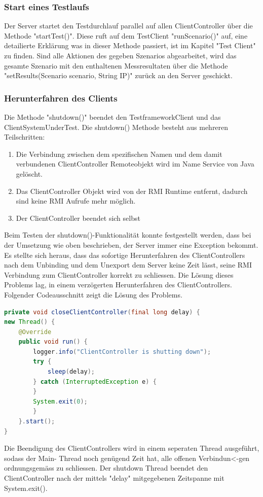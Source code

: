 \subsubsection{Start eines Testlaufs}
Der Server startet den Testdurchlauf parallel auf allen ClientController über die Methode "startTest()". Diese ruft auf dem TestClient "runScenario()" auf, eine detailierte Erklärung was in dieser Methode passiert, ist im Kapitel "Test Client" zu finden. Sind alle Aktionen des gegeben Szenarios abgearbeitet, wird das gesamte Szenario mit den enthaltenen Messresultaten über die Methode "setResults(Scenario scenario, String IP)" zurück an den Server geschickt.

\subsubsection{Herunterfahren des Clients}
Die Methode "shutdown()" be\-endet den Test\-framework\-Client und das Client\-System\-Under\-Test. Die shutdown() Methode besteht aus mehreren Teilschritten:
\begin{enumerate}
\item Die Verbindung zwischen dem spezifischen Namen und dem damit verbundenen ClientController Remoteobjekt wird im Name Service von Java gelöscht.
\item Das ClientController Objekt wird von der RMI Run\-time entfernt, da\-durch sind keine RMI Aufrufe mehr möglich.
\item Der ClientController beendet sich selbst
\end{enumerate}


Beim Testen der shutdown()-Funktionalität konnte festgestellt werden, dass bei der Umsetzung wie oben beschrieben, der Server immer eine Exception bekommt. Es stellte sich heraus, dass das sofortige Herunterfahren des ClientControllers nach dem Unbinding und dem Unexport dem Server keine Zeit lässt, seine RMI Verbindung zum ClientController korrekt zu schliessen. Die Lösung dieses Problems lag, in einem verzögerten Herunterfahren des ClientControllers. Folgender Codeausschnitt zeigt die Lösung des Problems.
\begin{lstlisting}[language=java, breaklines=true]
private void closeClientController(final long delay) {
new Thread() {
	@Override
	public void run() {
		logger.info("ClientController is shutting down");
		try {
			sleep(delay);
		} catch (InterruptedException e) {
		}
		System.exit(0);
		}
	}.start();
}
\end{lstlisting}
Die Beendigung des ClientControllers wird in einem seperaten Thread ausgeführt, so\-dass der Main- Thread noch ge\-nü\-gend Zeit hat, alle of\-fe\-nen Ver\-bin\-dun<-gen ord\-nungs\-gemäss zu schliessen. Der shutdown Thread beendet den ClientController nach der mittels "delay" mit\-ge\-ge\-be\-nen Zeit\-span\-ne mit System.exit().   

